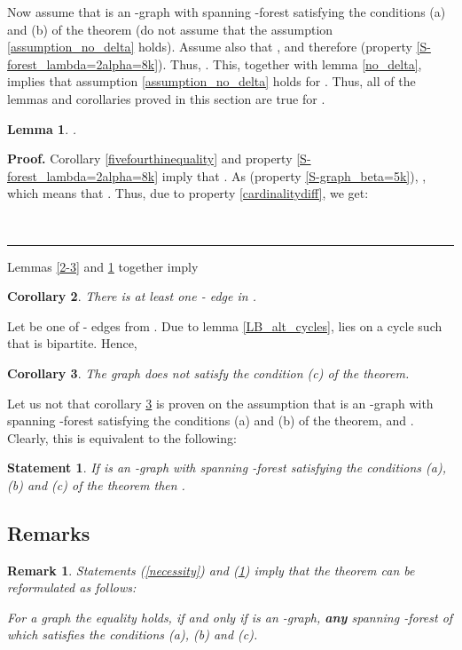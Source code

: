 \documentclass[a4paper, 12pt]{article}
\newtheorem{lemma}{Lemma}[subsection]
\newtheorem{statement}{Statement}
\newtheorem{corollary}[lemma]{Corollary}
\newtheorem{remark}{Remark}
\newenvironment{proof}[1][Proof]{\noindent\textbf{#1.} }{\ \rule{0.5em}{0.5em}}
\begin{document}
\bigskip

Now assume that  is an -graph with spanning -forest 
satisfying the conditions (a) and (b) of the theorem (do not assume
that the assumption \ref{assumption_no_delta} holds). Assume also
that , and therefore
 (property
\ref{S-forest_lambda=2alpha=8k}). Thus, . This, together with lemma \ref{no_delta}, implies that
assumption \ref{assumption_no_delta} holds for . Thus, all of the
lemmas and corollaries proved in this section are true for .

\begin{lemma} \label{MP^S>MP^H}
.
\end{lemma}
\begin{proof}
Corollary \ref{fivefourthinequality} and property
\ref{S-forest_lambda=2alpha=8k} imply that
. As  (property
\ref{S-graph_beta=5k}), , which means that
. Thus, due to property \ref{cardinalitydiff}, we get:

\end{proof}

Lemmas \ref{2-3} and \ref{MP^S>MP^H} together imply
\begin{corollary} \label{at_least_one_2-2}
There is at least one - edge in .
\end{corollary}

Let  be one of - edges from . Due to lemma
\ref{LB_alt_cycles},  lies on a cycle 
such that  is bipartite. Hence,

\begin{corollary} \label{does_not_satisfy_c}
The graph  does not satisfy the condition (c) of the theorem.
\end{corollary}

\bigskip

Let us not that corollary \ref{does_not_satisfy_c} is proven on the
assumption that  is an -graph with spanning -forest 
satisfying the conditions (a) and (b) of the theorem, and
. Clearly, this is
equivalent to the following:

\begin{statement}\label{sufficiency}
If  is an -graph with spanning -forest  satisfying the
conditions (a), (b) and (c) of the theorem then
.
\end{statement}


\subsection{Remarks}

\begin{remark}
Statements (\ref{necessity}) and (\ref{sufficiency}) imply that the
theorem can be reformulated as follows:

\textit{For a graph  the equality
 holds, if and only if 
is an -graph, \textbf{any} spanning -forest of which satisfies
the conditions (a), (b) and (c).}
\end{remark}
\end{document}
